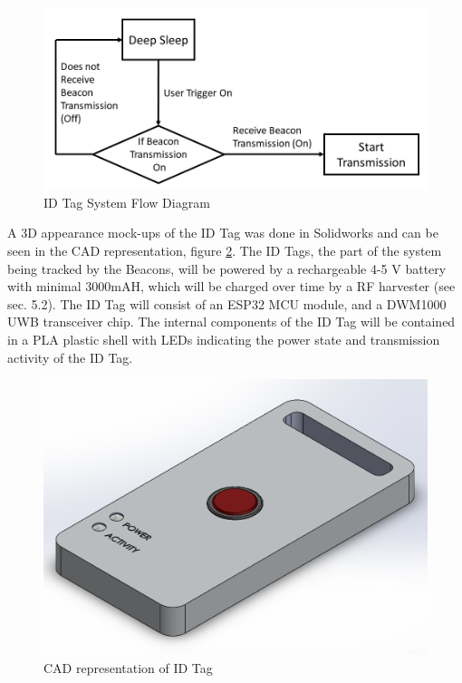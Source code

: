 \bigskip
\begin{figure}[H]
\centering
    \includegraphics[width=\linewidth]{./images/id_flow.png}
    \caption{ID Tag System Flow Diagram}
    \label{id_flow}
\end{figure}

\pagebreak
A 3D appearance mock-ups of the ID Tag was done in Solidworks and can be seen in the CAD representation, figure \ref{ID_Tag}. The ID Tags, the part of the system being tracked by the Beacons, will be powered by a rechargeable 4-5 V battery with minimal 3000mAH, which will be charged over time by a RF harvester (see sec. 5.2). The ID Tag will consist of an ESP32 MCU module, and a DWM1000 UWB transceiver chip. The internal components of the ID Tag will be contained in a \Gls{PLA} plastic shell with LEDs indicating the power state and transmission activity of the ID Tag. 

\bigskip
\begin{figure}[H]
\centering
    \includegraphics[width=\linewidth]{./images/ID_Tag.png}
    \caption{CAD representation of ID Tag}
    \label{ID_Tag}
\end{figure}



